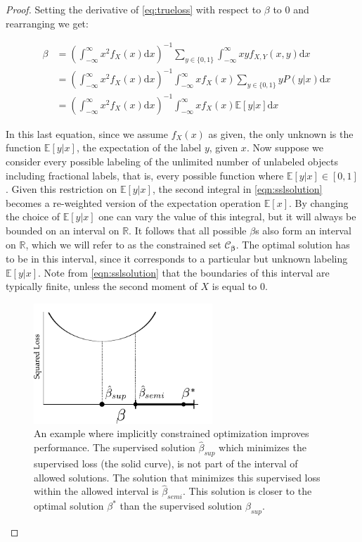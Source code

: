 \documentclass{llncs}
\begin{document}
\begin{proof}

Setting the derivative of \eqref{eq:trueloss} with respect to $\beta$ to $0$ and rearranging we get:

\begin{eqnarray}
&\beta & = \left( \int_{-\infty}^{\infty} { x^2 f_X(x) \mathrm{d}x} \right)^{-1} \sum_{y \in \{0,1\}} \int_{-\infty}^{\infty} { x y f_{X,Y}(x,y) \mathrm{d}x } \\
& & =    \left( \int_{-\infty}^{\infty} { x^2 f_X(x) \mathrm{d}x} \right)^{-1}  \int_{-\infty}^{\infty} { x f_X(x) \sum_{y \in \{0,1\}} y P(y|x) \mathrm{d}x} \\
& & =   \left( \int_{-\infty}^{\infty} { x^2 f_X(x) \mathrm{d}x} \right)^{-1}  \int_{-\infty}^{\infty} { x f_X(x) \mathbb{E}[y|x] \mathrm{d}x} \label{eqn:sslsolution}
\end{eqnarray}

In this last equation, since we assume $f_X(x)$ as given, the only unknown is the function $\mathbb{E}[y|x]$, the expectation of the label $y$, given $x$. Now suppose we consider every possible labeling of the unlimited number of unlabeled objects including fractional labels, that is, every possible function where $\mathbb{E}[y|x] \in [0,1]$. Given this restriction on $\mathbb{E}[y|x]$, the second integral in \eqref{eqn:sslsolution} becomes a re-weighted version of the expectation operation $\mathbb{E}[x]$. By changing the choice of $\mathbb{E}[y|x]$ one can vary the value of this integral, but it will always be bounded on an interval on $\mathbb{R}$. It follows that all possible $\beta$s also form an interval on $\mathbb{R}$, which we will refer to as the constrained set $\mathcal{C}_{\boldsymbol{\beta}}$. The optimal solution has to be in this interval, since it corresponds to a particular but unknown labeling $\mathbb{E}[y|x]$. Note from \eqref{eqn:sslsolution} that the boundaries of this interval are typically finite, unless the second moment of $X$ is equal to $0$.

\begin{figure}[t] 
  \centering
      \includegraphics[width=0.6\textwidth]{1Dconstrainedspace.pdf}
  \caption{An example where implicitly constrained optimization improves performance. The supervised solution $\hat{\beta}_{sup}$ which minimizes the supervised loss (the solid curve), is not part of the interval of allowed solutions. The solution that minimizes this supervised loss within the allowed interval is $\hat{\beta}_{semi}$. This solution is closer to the optimal solution ${\beta}^{\ast}$ than the supervised solution $\hat{\beta}_{sup}$.} \label{fig:constrainedproblem}
\end{figure}


\end{proof}
\end{document}
